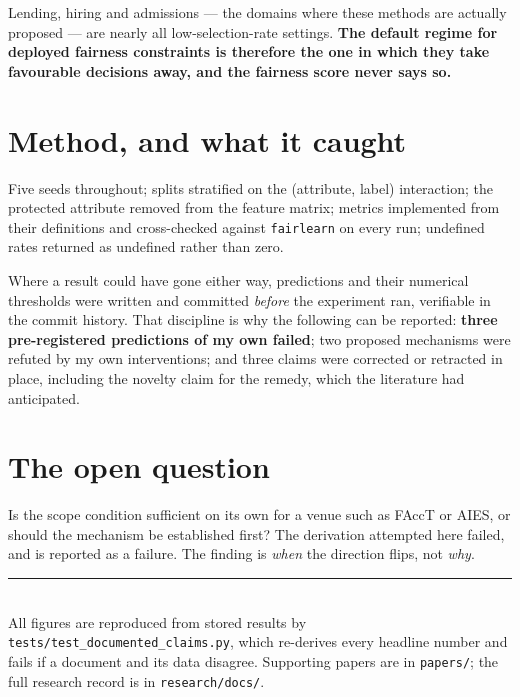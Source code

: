 \documentclass[11pt,a4paper]{article}
\begin{document}
Lending, hiring and admissions --- the domains where these methods are actually proposed ---
are nearly all low-selection-rate settings. \textbf{The default regime for deployed fairness
constraints is therefore the one in which they take favourable decisions away, and the
fairness score never says so.}

\section{Method, and what it caught}

Five seeds throughout; splits stratified on the (attribute, label) interaction; the
protected attribute removed from the feature matrix; metrics implemented from their
definitions and cross-checked against \texttt{fairlearn} on every run; undefined rates
returned as undefined rather than zero.

Where a result could have gone either way, predictions and their numerical thresholds were
written and committed \emph{before} the experiment ran, verifiable in the commit history.
That discipline is why the following can be reported: \textbf{three pre-registered
predictions of my own failed}; two proposed mechanisms were refuted by my own interventions;
and three claims were corrected or retracted in place, including the novelty claim for the
remedy, which the literature had anticipated.

\section{The open question}

Is the scope condition sufficient on its own for a venue such as FAccT or AIES, or should
the mechanism be established first? The derivation attempted here failed, and is reported as
a failure. The finding is \emph{when} the direction flips, not \emph{why}.

\vfill
\noindent\rule{\textwidth}{0.4pt}\\
{\small All figures are reproduced from stored results by
\texttt{tests/test\_documented\_claims.py}, which re-derives every headline number and fails
if a document and its data disagree. Supporting papers are in \texttt{papers/}; the full
research record is in \texttt{research/docs/}.}
\end{document}
